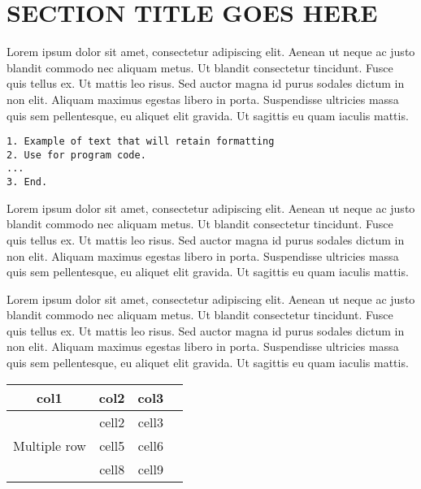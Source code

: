 \documentclass{csmagazine}
\begin{document}
\section*{SECTION TITLE GOES HERE}

Lorem ipsum dolor sit amet, consectetur adipiscing elit. Aenean ut neque ac justo blandit commodo nec aliquam metus. Ut blandit consectetur tincidunt. Fusce quis tellus ex. Ut mattis leo risus. Sed auctor magna id purus sodales dictum in non elit. Aliquam maximus egestas libero in porta. Suspendisse ultricies massa quis sem pellentesque, eu aliquet elit gravida. Ut sagittis eu quam iaculis mattis.


\begin{verbatim}
1. Example of text that will retain formatting
2. Use for program code.
...
3. End.
\end{verbatim}

Lorem ipsum dolor sit amet, consectetur adipiscing elit. Aenean ut neque ac justo blandit commodo nec aliquam metus. Ut blandit consectetur tincidunt. Fusce quis tellus ex. Ut mattis leo risus. Sed auctor magna id purus sodales dictum in non elit. Aliquam maximus egestas libero in porta. Suspendisse ultricies massa quis sem pellentesque, eu aliquet elit gravida. Ut sagittis eu quam iaculis mattis.

Lorem ipsum dolor sit amet, consectetur adipiscing elit. Aenean ut neque ac justo blandit commodo nec aliquam metus. Ut blandit consectetur tincidunt. Fusce quis tellus ex. Ut mattis leo risus. Sed auctor magna id purus sodales dictum in non elit. Aliquam maximus egestas libero in porta. Suspendisse ultricies massa quis sem pellentesque, eu aliquet elit gravida. Ut sagittis eu quam iaculis mattis.


\begin{table}[h!]
	\begin{center}
		\begin{tabular}{ |c|c|c|c| } 
			\hline
			col1 & col2 & col3 \\
			\hline
			\multirow{3}{4em}{Multiple row} & cell2 & cell3 \\ 
			& cell5 & cell6 \\ 
			& cell8 & cell9 \\ 
			\hline
		\end{tabular}
	\end{center}
\end{table}
\end{document}
